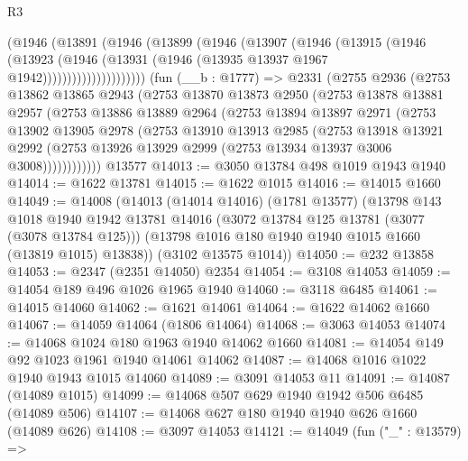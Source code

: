 \begin{lexlean}{R3}
\begin{coremodule}
                  (@1946
                    (@13891
                      (@1946
                        (@13899
                          (@1946
                            (@13907
                              (@1946
                                (@13915
                                  (@1946
                                    (@13923
                                      (@1946
                                        (@13931
                                          (@1946 (@13935 @13937 @1967 @1942)))))))))))))))))))))
    (fun (__b : @1777) =>
    @2331
      (@2755
        @2936
        (@2753
          @13862
          @13865
          @2943
          (@2753
            @13870
            @13873
            @2950
            (@2753
              @13878
              @13881
              @2957
              (@2753
                @13886
                @13889
                @2964
                (@2753
                  @13894
                  @13897
                  @2971
                  (@2753
                    @13902
                    @13905
                    @2978
                    (@2753
                      @13910
                      @13913
                      @2985
                      (@2753
                        @13918
                        @13921
                        @2992
                        (@2753 @13926 @13929 @2999 (@2753 @13934 @13937 @3006 @3008))))))))))))
    @13577
@14013 := @3050 @13784 @498 @1019 @1943 @1940
@14014 := @1622 @13781
@14015 := @1622 @1015
@14016 := @14015 @1660
@14049 := @14008
    (@14013
      (@14014 @14016)
      (@1781 @13577)
      (@13798
        @143
        @1018
        @1940
        @1942
        @13781
        @14016
        (@3072 @13784 @125 @13781 (@3077 (@3078 @13784 @125)))
        (@13798 @1016 @180 @1940 @1940 @1015 @1660 (@13819 @1015) @13838))
      (@3102 @13575 @1014))
@14050 := @232 @13858
@14053 := @2347 (@2351 @14050) @2354
@14054 := @3108 @14053
@14059 := @14054 @189 @496 @1026 @1965 @1940
@14060 := @3118 @6485
@14061 := @14015 @14060
@14062 := @1621 @14061
@14064 := @1622 @14062 @1660
@14067 := @14059 @14064 (@1806 @14064)
@14068 := @3063 @14053
@14074 := @14068 @1024 @180 @1963 @1940 @14062 @1660
@14081 := @14054 @149 @92 @1023 @1961 @1940 @14061 @14062
@14087 := @14068 @1016 @1022 @1940 @1943 @1015 @14060
@14089 := @3091 @14053 @11
@14091 := @14087 (@14089 @1015)
@14099 := @14068 @507 @629 @1940 @1942 @506 @6485 (@14089 @506)
@14107 := @14068 @627 @180 @1940 @1940 @626 @1660 (@14089 @626)
@14108 := @3097 @14053
@14121 := @14049
    (fun ("_" : @13579) =>

\end{coremodule}
\end{lexlean}

